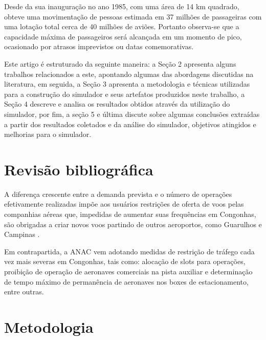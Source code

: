 \documentclass[12pt]{article}
\begin{document}
  Desde da sua inauguração no ano 1985, com uma área de 14 km quadrado,
  obteve uma movimentação de pessoas estimada em  37 milhões de passageiras
  com uma lotação total cerca de 40 milhões de aviões. Portanto observa-se
  que a capacidade máxima de passageiros será alcançada em um momento de
  pico, ocasionado por atrasos imprevistos ou datas comemorativas.
  




Este artigo é estruturado da seguinte maneira: a Seção 2 apresenta alguns trabalhos
relacionados a este, apontando algumas das abordagens discutidas na literatura,
em seguida, a Seção 3 apresenta a metodologia e técnicas utilizadas para a construção 
do simulador e seus artefatos produzidos neste trabalho, a Seção 4 descreve e analisa 
os resultados obtidos através da utilização do simulador, por fim, a seção 5 e última 
discute sobre algumas conclusões extraídas a partir dos resultados coletados e da 
análise do simulador, objetivos atingidos e melhorias para o simulador.
  

\section{Revisão bibliográfica} \label{sec:revisaobibliografica}

A diferença crescente entre a demanda prevista e o número de
operações efetivamente realizadas impõe aos usuários
restrições de oferta de voos pelas companhias aéreas que,
impedidas de aumentar suas frequências em Congonhas, são 
obrigadas a criar novos voos partindo de outros aeroportos,
como Guarulhos e Campinas \cite{boulic:91}.

Em contrapartida, a ANAC vem adotando medidas de restrição 
de tráfego cada vez mais severas em Congonhas, tais como: 
alocação de slots para operações, proibição de operação de 
aeronaves comerciais na pista auxiliar e determinação de tempo
máximo de permanência de aeronaves nos boxes de estacionamento,
entre outras. 





\section{Metodologia}
\end{document}
